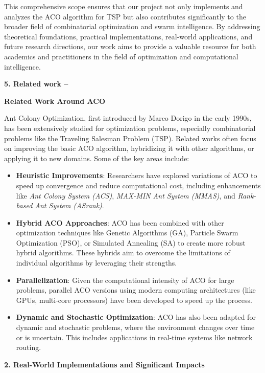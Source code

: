 \documentclass[
]{article}
\begin{document}
This comprehensive scope ensures that our project not only implements
and analyzes the ACO algorithm for TSP but also contributes
significantly to the broader field of combinatorial optimization and
swarm intelligence. By addressing theoretical foundations, practical
implementations, real-world applications, and future research
directions, our work aims to provide a valuable resource for both
academics and practitioners in the field of optimization and
computational intelligence.


\textbf{5. Related work --}

\textbf{Related Work Around ACO}

Ant Colony Optimization, first introduced by Marco Dorigo in the early
1990s, has been extensively studied for optimization problems,
especially combinatorial problems like the Traveling Salesman Problem
(TSP). Related works often focus on improving the basic ACO algorithm,
hybridizing it with other algorithms, or applying it to new domains.
Some of the key areas include:

\begin{itemize}
\item
  \textbf{Heuristic Improvements}: Researchers have explored variations
  of ACO to speed up convergence and reduce computational cost,
  including enhancements like \emph{Ant Colony System (ACS)},
  \emph{MAX-MIN Ant System (MMAS)}, and \emph{Rank-based Ant System
  (ASrank)}.
\item
  \textbf{Hybrid ACO Approaches}: ACO has been combined with other
  optimization techniques like Genetic Algorithms (GA), Particle Swarm
  Optimization (PSO), or Simulated Annealing (SA) to create more robust
  hybrid algorithms. These hybrids aim to overcome the limitations of
  individual algorithms by leveraging their strengths.
\item
  \textbf{Parallelization}: Given the computational intensity of ACO for
  large problems, parallel ACO versions using modern computing
  architectures (like GPUs, multi-core processors) have been developed
  to speed up the process.
\item
  \textbf{Dynamic and Stochastic Optimization}: ACO has also been
  adapted for dynamic and stochastic problems, where the environment
  changes over time or is uncertain. This includes applications in
  real-time systems like network routing.
\end{itemize}

\textbf{2. Real-World Implementations and Significant Impacts}
\end{document}
